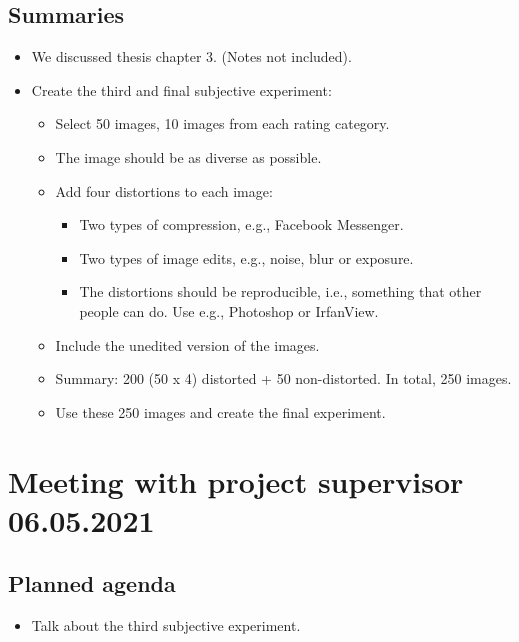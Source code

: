 \subsection*{Summaries}
\begin{itemize}
    \item We discussed thesis chapter 3. (Notes not included).
    \item Create the third and final subjective experiment:
    \begin{itemize}
        \item Select 50 images, 10 images from each rating category.
        \item The image should be as diverse as possible.
        \item Add four distortions to each image:
        \begin{itemize}
            \item Two types of compression, e.g., Facebook Messenger.
            \item Two types of image edits, e.g., noise, blur or exposure.
            \item The distortions should be reproducible, i.e., something that other people can do. Use e.g., Photoshop or IrfanView.
        \end{itemize}
    \item Include the unedited version of the images.
    \item Summary: 200 (50 x 4) distorted + 50 non-distorted. In total, 250 images.
    \item Use these 250 images and create the final experiment.
    \end{itemize}
\end{itemize}


\section*{Meeting with project supervisor 06.05.2021}
\subsection*{Planned agenda}
\begin{itemize}
    \item Talk about the third subjective experiment.
\end{itemize}

